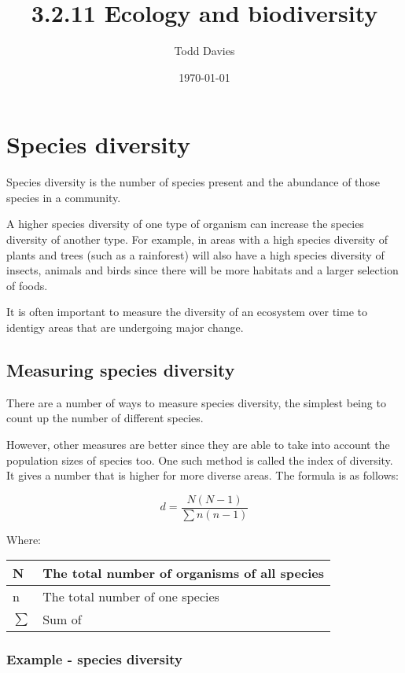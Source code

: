 \documentclass{article}
\author{Todd Davies}
\title{3.2.11 Ecology and biodiversity}
\date{\today}
\begin{document}
\lhead{\today}

\maketitle

\section{Species diversity}
\thispagestyle{empty}

Species diversity is the number of species present and the abundance of those
species in a community.

A higher species diversity of one type of organism can increase the species
diversity of another type. For example, in areas with a high species diversity
of plants and trees (such as a rainforest) will also have a high species
diversity of insects, animals and birds since there will be more habitats and a
larger selection of foods.

It is often important to measure the diversity of an ecosystem over time to
identigy areas that are undergoing major change.

\subsection{Measuring species diversity}

There are a number of ways to measure species diversity, the simplest being to
count up the number of different species.

However, other measures are better since they are able to take into account the
population sizes of species too. One such method is called the index of
diversity. It gives a number that is higher for more diverse areas. The formula is as follows:

\[
	d = \frac{N(N-1)}{\sum n(n-1)}
\]

Where:

\begin{center}
\begin{tabular}{|l|l|}
	\hline
	N & The total number of organisms of all species\\ \hline
	n & The total number of one species\\ \hline
	$\sum$ & Sum of\\ \hline
\end{tabular}
\end{center}

\subsubsection{Example - species diversity}
\end{document}
